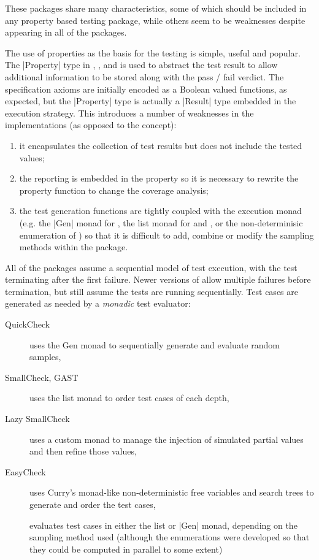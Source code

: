 These  packages share many characteristics,
some of which should be included in any property based testing package,
while others seem to be weaknesses despite appearing in all of the packages.

The use of properties as the basis for the testing is simple, useful and popular.
The |Property| type in \QC, \SC, and \GAST is used to 
abstract the test result to allow 
additional information to be stored along with the pass / fail verdict.
The specification axioms are initially encoded as a Boolean valued functions,
as expected, but the |Property| type is actually 
a |Result| type embedded in the execution strategy.
This introduces  a number of weaknesses in the implementations
(as opposed to the concept):

\begin{enumerate}
\item it encapsulates the collection of test results but does not include the tested values;
\item the reporting is embedded in the property so it is necessary to rewrite 
the property function to change the coverage analysis;
\item the test generation functions are tightly coupled with the execution monad 
(e.g. the |Gen| monad for \QC, the list monad for \GAST and \SC, 
or the non-determinisic enumeration of \EC) so 
that it is difficult to add, combine or modify the sampling methods within the package.
\end{enumerate}

All of the packages assume a sequential model of test execution,
with the test terminating after the first failure.
Newer versions of \QC allow multiple failures before termination,
but still assume the tests are running sequentially.
Test cases are generated as needed by a \emph{monadic} test evaluator:

\begin{description}
\item [QuickCheck] uses the Gen monad to sequentially generate and evaluate random samples,
\item [SmallCheck, GAST] uses the list monad to order test cases of each depth,
\item [Lazy SmallCheck] uses a custom monad to manage the injection
of simulated partial values and then refine those values,
\item [EasyCheck] uses Curry's monad-like non-deterministic free variables and search trees
to generate and order the test cases,
\item[\FEAT] evaluates test cases in either the list or |Gen| monad,
depending on the sampling method used
(although the enumerations were developed so that
they could be computed in parallel to some extent)
\end{description}

